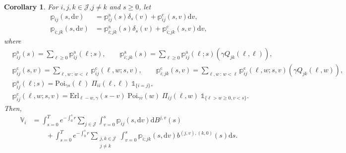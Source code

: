 \documentclass[11pt,leqno]{amsart}
\numberwithin{table}{section}
\numberwithin{figure}{section}
\numberwithin{equation}{section}
\newcommand{\dd}{\mathrm{d}}
\newcommand{\1}{{\mathds{1}}}
\newcommand{\0}{\mat{0}}
\newtheorem{corollary}[lemma]{Corollary}
\newcommand{\ap}[1]{\mathbb{#1}}
\begin{document}
\begin{corollary}\label{cor:appValue1}
For $i,j,k\in\mathcal{J}$,$j\neq k$ and $s\ge 0$, let
\begin{align}
\ap{p}_{ij}(s, \dd v) & = \ap{p}_{ij}^{\mathrm{a}}(s)\delta_{s}(v) + \ap{p}_{ij}^{\mathrm{c}}(s, v)\dd v,\label{eq:aptpij}\\
\ap{p}_{i;jk}(s, \dd v) & = \ap{p}_{i;jk}^{\mathrm{a}}(s)\delta_{s}(v) + \ap{p}_{i;jk}^{\mathrm{c}}(s, v)\dd v,\label{eq:aptpijk}
\end{align}
where
\begin{align*} 
&\ap{p}_{ij}^{\mathrm{a}}(s) = \sum_{\ell\ge 0} \ap{p}_{ij}^{\mathrm{a}}(\ell; s),\qquad\ap{p}_{i;jk}^{\mathrm{a}}(s) = \sum_{\ell\ge 0} \ap{p}_{ij}^{\mathrm{a}}(\ell; s)(\gamma Q_{jk}(\ell,\ell)),\\
&\ap{p}_{ij}^{\mathrm{c}}(s,v) = \sum_{\ell, w\,:\, w< \ell} \ap{p}_{ij}^{\mathrm{c}}(\ell, w; s,v),\qquad \ap{p}_{i;jk}^{\mathrm{c}}(s,v) = \sum_{\ell, w\,:\, w< \ell} \ap{p}_{ij}^{\mathrm{c}}(\ell, w; s,v)(\gamma Q_{jk}(\ell,w)),\\
&\ap{p}_{ij}^{\mathrm{a}}(\ell; s) = \mathrm{Poi}_{\gamma s}(\ell)\; {\Pi}_{ii}(\ell, \ell)\;\mathds{1}_{\{i=j\}},\\
&\ap{p}_{ij}^{\mathrm{c}}(\ell, w; s,v) = \mathrm{Erl}_{\ell-w,\gamma}(s-v) \; \mathrm{Poi}_{\gamma v} (w)\; {\Pi}_{ij}(\ell, w)\;\mathds{1}_{\{\ell>w\ge 0, v<s\}}.
\end{align*}
Then,
\begin{align}
\ap{V}_{i}& = \int_{s=0}^T e^{-\int_0^s r} \sum_{j\in\mathcal{J}}\int_{v=0}^s \ap{p}_{ij}(s,\dd v) \dd B^{j,v}(s)\nonumber\\
&\qquad + \int_{s=0}^T e^{-\int_0^s r} \sum_{\substack{j,k\in\mathcal{J}\\ j\neq k}}\int_{v=0}^s \ap{p}_{i;jk}(s,\dd v) b^{(j,v),(k,0)}(s)\dd s.\label{eq:Vi1}
\end{align}
\end{corollary}
\end{document}
